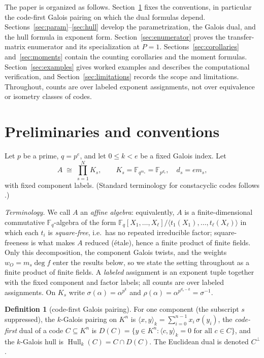 \documentclass[11pt]{article}
\theoremstyle{definition}
\newtheorem{definition}[theorem]{Definition}
\theoremstyle{remark}
\newcommand{\Fq}{\mathbb{F}_q}
\newcommand{\Hull}{\operatorname{Hull}}
\begin{document}
The paper is organized as follows. Section~\ref{sec:prelim} fixes the
conventions, in particular the code-first Galois pairing on which the
dual formulas depend. Sections~\ref{sec:param}--\ref{sec:hull}
develop the parametrization, the Galois dual, and the hull formula in
exponent form. Section~\ref{sec:enumerator} proves the
transfer-matrix enumerator and its specialization at \(P=1\).
Sections~\ref{sec:corollaries} and~\ref{sec:moments} contain the
counting corollaries and the moment formulas.
Section~\ref{sec:examples} gives worked examples and describes the
computational verification, and Section~\ref{sec:limitations} records
the scope and limitations. Throughout, counts are over labeled
exponent assignments, not over equivalence or isometry classes of
codes.

\section{Preliminaries and conventions}\label{sec:prelim}

Let \(p\) be a prime, \(q = p^e\), and let \(0 \le k < e\) be a fixed
Galois index. Let
\[
A \;\cong\; \prod_{s=1}^{N} K_s, \qquad
K_s = \mathbb{F}_{q^{m_s}} = \mathbb{F}_{p^{d_s}}, \quad d_s = e m_s,
\]
with fixed component labels. (Standard terminology for constacyclic codes
follows \cite{HP2003, MS1977}.)

\emph{Terminology.} We call \(A\) an \emph{affine algebra}: equivalently,
\(A\) is a finite-dimensional commutative \(\Fq\)-algebra of the form
\(\Fq[X_1,\dots,X_\ell]/\langle t_1(X_1),\dots,t_\ell(X_\ell)\rangle\)
in which each \(t_i\) is \emph{square-free}, i.e.\ has no repeated
irreducible factor; square-freeness is what makes \(A\) reduced
(\'etale), hence a finite product of finite fields. Only this
decomposition, the component Galois twists, and the weights
\(w_O = m_s \deg f\) enter the results below, so we state the setting
throughout as a finite product of finite fields. A \emph{labeled}
assignment is an exponent tuple together with the fixed component and
factor labels; all counts are over labeled assignments. On \(K_s\) write
\(\sigma(\alpha) = \alpha^{p^k}\) and
\(\rho(\alpha) = \alpha^{p^{d_s - k}} = \sigma^{-1}\).

\begin{definition}[code-first Galois pairing]
For one component (the subscript \(s\) suppressed), the \(k\)-Galois
pairing on \(K^n\) is
\(\langle x, y \rangle_k = \sum_{i=0}^{n-1} x_i \, \sigma(y_i)\),
the \emph{code-first} dual of a code \(C \subseteq K^n\) is
\(D(C) = \{ y \in K^n : \langle c, y \rangle_k = 0 \text{ for all } c \in C\}\),
and the \(k\)-Galois hull is \(\Hull_k(C) = C \cap D(C)\).
The Euclidean dual is denoted \(C^\perp\).
\end{definition}
\end{document}
